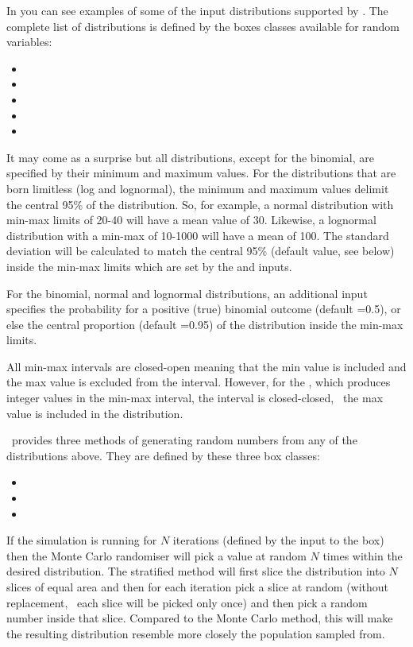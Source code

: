 In  you can see examples of some of the input distributions supported by \US. The complete list of distributions is defined by the boxes classes available for random variables:
\begin{itemize}
\item {}
\item {}
\item {}
\item {}
\item {}
\end{itemize}
It may come as a surprise but all distributions, except for the binomial, are specified by their minimum and maximum values. For the distributions that are born limitless (log and lognormal), the minimum and maximum values delimit the central 95\% of the distribution. So, for example, a normal distribution with min-max limits of 20-40 will have a mean value of 30. Likewise, a lognormal distribution with a min-max of 10-1000 will have a mean of 100. The standard deviation will be calculated to match the central 95\% (default value, see below) inside the min-max limits which are set by the  and  inputs.

For the binomial, normal and lognormal distributions, an additional input  specifies the probability for a positive (true) binomial outcome (default =0.5), or else the central proportion (default =0.95) of the distribution inside the min-max limits.

All min-max intervals are closed-open meaning that the min value is included and the max value is excluded from the interval. However, for the , which produces integer values in the min-max interval, the interval is closed-closed, \ie\ the max value is included in the distribution.

\US\ provides three methods of generating random numbers from any of the distributions above. They are defined by these three box classes:
\begin{itemize}
\item {}
\item {}
\item {}
\end{itemize}
If the simulation is running for $N$ iterations (defined by the  input to the  box) then the Monte Carlo randomiser will pick a value at random $N$ times within the desired distribution. The stratified method will first slice the distribution into $N$ slices of equal area and then for each iteration pick a slice at random (without replacement, \ie\ each slice will be picked only once) and then pick a random number inside that slice. Compared to the Monte Carlo method, this will make the resulting distribution resemble more closely the population sampled from.

